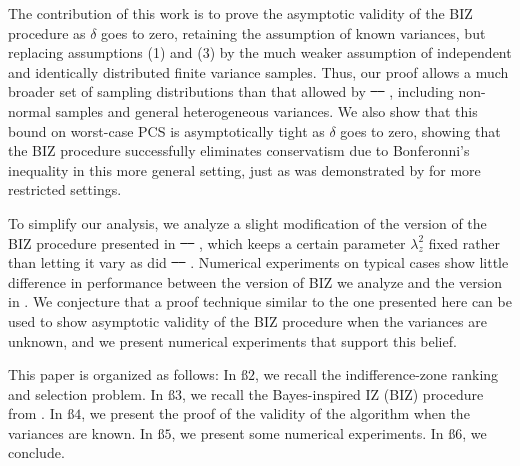 \documentclass{wscpaperproc}
\theoremstyle{wsc}
\providecommand{\DIFaddtex}[1]{{\protect\color{blue}\uwave{#1}}} %
\providecommand{\DIFdeltex}[1]{{\protect\color{red}\sout{#1}}}                      %
\providecommand{\DIFaddbegin}{} %
\providecommand{\DIFaddend}{} %
\providecommand{\DIFdelbegin}{} %
\providecommand{\DIFdelend}{} %
\providecommand{\DIFadd}[1]{\texorpdfstring{\DIFaddtex{#1}}{#1}} %
\providecommand{\DIFdel}[1]{\texorpdfstring{\DIFdeltex{#1}}{}} %
\begin{document}
The contribution of this work is to prove the asymptotic validity of the BIZ procedure as $\delta$ goes to zero, retaining the assumption of known variances, but replacing assumptions (1) and (3) by the much weaker assumption of independent and identically distributed finite variance samples.  Thus, our proof allows a much broader set of sampling distributions than that allowed by \DIFdelbegin \DIFdel{\mbox{%
\cite{Frazier:BIZ}
}%
}\DIFdelend \DIFaddbegin \DIFadd{\mbox{%
}%
}\DIFaddend , including non-normal samples and general heterogeneous variances. 
We also show that this bound on worst-case PCS is asymptotically tight as $\delta$ goes to zero, 
showing that the BIZ procedure successfully eliminates conservatism due to Bonferonni's inequality in this more general setting, just as was demonstrated by  for more restricted settings.

To simplify our analysis, we analyze a slight modification of the version of the BIZ procedure presented in \DIFdelbegin \DIFdel{\mbox{%
\cite{Frazier:BIZ}
}%
}\DIFdelend \DIFaddbegin \DIFadd{\mbox{%
}%
}\DIFaddend , which keeps a certain parameter $\lambda^2_z$ fixed rather than letting it vary as did \DIFdelbegin \DIFdel{\mbox{%
\cite{Frazier:BIZ}
}%
}\DIFdelend \DIFaddbegin \DIFadd{\mbox{%
}%
}\DIFaddend .  Numerical experiments on typical cases show little difference in performance between the version of BIZ we analyze and the version in .
We conjecture that a proof technique similar to the one presented here can be used to show asymptotic validity of the BIZ procedure when
the variances are unknown, and we present numerical experiments that support this belief. 


This paper is organized as follows: In \DIFdelbegin \DIFdel{$\text{ß}2$}\DIFdelend \DIFaddbegin \DIFadd{$\mathsection$\ref{IZR}}\DIFaddend , we recall the
indifference-zone ranking and selection problem. In \DIFdelbegin \DIFdel{$\text{ß}3$}\DIFdelend \DIFaddbegin \DIFadd{$\mathsection$\ref{sec:BIZ}}\DIFaddend ,
we recall the Bayes-inspired IZ (BIZ) procedure from . In \DIFdelbegin \DIFdel{$\text{ß}4$}\DIFdelend \DIFaddbegin \DIFadd{$\mathsection$\ref{proof}}\DIFaddend ,
we present the proof of the validity of the algorithm when the variances
are known. In \DIFdelbegin \DIFdel{$\text{ß}5$}\DIFdelend \DIFaddbegin \DIFadd{$\mathsection$\ref{numericalExperiments}}\DIFaddend , we present some numerical experiments. 
In \DIFdelbegin \DIFdel{$\text{ß}6$}\DIFdelend \DIFaddbegin \DIFadd{$\mathsection$\ref{conclusion}}\DIFaddend , we conclude.
\end{document}
